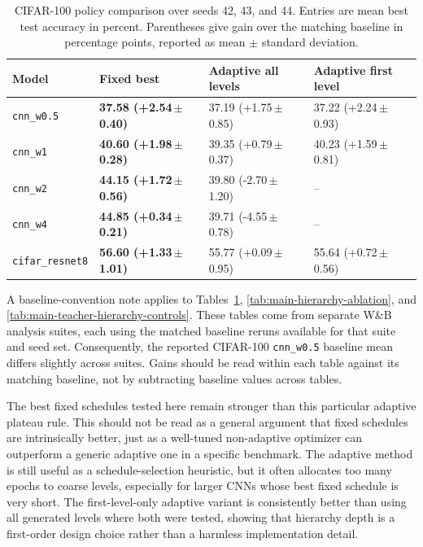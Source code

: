 \documentclass[english,master,a4paper,oneside]{ppfcmthesis}
\begin{document}
\begin{table}[htbp]
\centering
\scriptsize
\begin{tabular}{llll}
\toprule
Model & Fixed best & Adaptive all levels & Adaptive first level \\
\midrule
\texttt{cnn\_w0.5} & \textbf{37.58 (+2.54\,$\pm$\,0.40)} & 37.19 (+1.75\,$\pm$\,0.85) & 37.22 (+2.24\,$\pm$\,0.93) \\
\texttt{cnn\_w1} & \textbf{40.60 (+1.98\,$\pm$\,0.28)} & 39.35 (+0.79\,$\pm$\,0.37) & 40.23 (+1.59\,$\pm$\,0.81) \\
\texttt{cnn\_w2} & \textbf{44.15 (+1.72\,$\pm$\,0.56)} & 39.80 (-2.70\,$\pm$\,1.20) & -- \\
\texttt{cnn\_w4} & \textbf{44.85 (+0.34\,$\pm$\,0.21)} & 39.71 (-4.55\,$\pm$\,0.78) & -- \\
\texttt{cifar\_resnet8} & \textbf{56.60 (+1.33\,$\pm$\,1.01)} & 55.77 (+0.09\,$\pm$\,0.95) & 55.64 (+0.72\,$\pm$\,0.56) \\
\bottomrule
\end{tabular}
\caption{CIFAR-100 policy comparison over seeds 42, 43, and 44. Entries are
mean best test accuracy in percent. Parentheses give gain over the matching
baseline in percentage points, reported as mean $\pm$ standard deviation.}
\label{tab:main-cifar100-policy}
\end{table}

A baseline-convention note applies to Tables~\ref{tab:main-cifar100-policy},
\ref{tab:main-hierarchy-ablation}, and
\ref{tab:main-teacher-hierarchy-controls}. These tables come from separate W\&B
analysis suites, each using the matched baseline reruns available for that suite
and seed set. Consequently, the reported CIFAR-100 \texttt{cnn\_w0.5} baseline
mean differs slightly across suites. Gains should be read within each table
against its matching baseline, not by subtracting baseline values across tables.

The best fixed schedules tested here remain stronger than this particular
adaptive plateau rule. This should not be read as a general argument that fixed
schedules are intrinsically better, just as a well-tuned non-adaptive optimizer
can outperform a generic adaptive one in a specific benchmark. The adaptive method is
still useful as a schedule-selection heuristic, but it often allocates too many
epochs to coarse levels, especially for larger CNNs whose best fixed schedule is
very short. The first-level-only adaptive variant is consistently better than
using all generated levels where both were tested, showing that hierarchy depth
is a first-order design choice rather than a harmless implementation detail.
\end{document}
